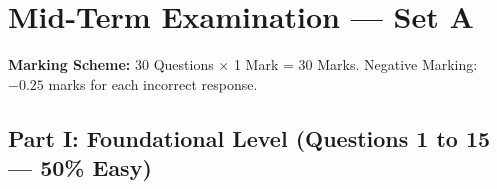 \section{Mid-Term Examination --- Set A}

\vspace{3mm}
\noindent\textbf{Marking Scheme:} 30 Questions $\times$ 1 Mark = 30 Marks. Negative Marking: $-0.25$ marks for each incorrect response.

\vspace{4mm}
\subsection*{Part I: Foundational Level (Questions 1 to 15 --- 50\% Easy)}

